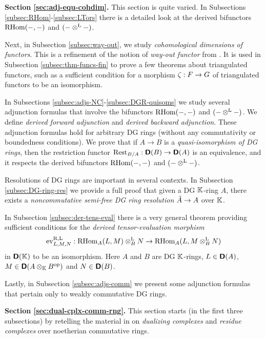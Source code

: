 \medskip \noindent 
{\bf Section \ref{sec:adj-equ-cohdim}.}
This section is quite varied. 
In Subsections \ref{subsec:RHom}-\ref{subsec:LTors} there is
a detailed look at the derived bifunctors 
$\operatorname{RHom}(-,-)$ and $(- \otimes^{\mathrm{L}} -)$. 

Next, in Subsection \ref{subsec:way-out}, we study {\em cohomological 
dimensions of functors}. This is a refinement of the notion of {\em way-out 
functor} from \cite{RD}. It is used in Subsection \ref{subsec:thm-funcs-fin} to 
prove a few theorems about triangulated functors, such as a sufficient condition 
for a morphism $\zeta : F \to G$ of triangulated functors to be an isomorphism. 

In Subsections \ref{subsec:adjs-NC}-\ref{subsec:DGR-quisoms} we study 
several adjunction formulas that involve 
the bifunctors $\operatorname{RHom}(-,-)$ and $(- \otimes^{\mathrm{L}} -)$.
We define {\em derived forward adjunction} and  
{\em derived backward adjunction}. These adjunction formulas hold for 
arbitrary DG rings (without any commutativity or boundedness conditions). 
We prove that if $A \to B$ is a {\em quasi-isomorphism of DG rings}, then 
the restriction functor 
$\operatorname{Rest}_{B / A} : \boldsymbol{\mathsf{D}}(B) \to \boldsymbol{\mathsf{D}}(A)$
is an equivalence, and it respects the derived bifunctors 
$\operatorname{RHom}(-,-)$ and $(- \otimes^{\mathrm{L}} -)$.

Resolutions of DG rings are important in several contexts. In Subsection 
\ref{subsec:DG-ring-res} we provide a full proof that given a 
DG $\mathbb{K}$-ring $A$, there exists a {\em noncommutative semi-free DG ring 
resolution} $\tilde{A} \to A$ over $\mathbb{K}$.

In Subsection \ref{subsec:der-tens-eval} there is a very general 
theorem providing sufficient conditions for the {\em derived tensor-evaluation 
morphism}
\begin{equation} \label{eqn:4610}
\operatorname{ev}^{\mathrm{R, L}}_{L, M, N} :
\operatorname{RHom}_{A}(L, M) \otimes^{\mathrm{L}}_{B} N \to 
\operatorname{RHom}_{A}(L, M \otimes^{\mathrm{L}}_{B} N)
\end{equation}
in $\boldsymbol{\mathsf{D}}(\mathbb{K})$ to be an isomorphism. Here $A$ and $B$ are DG $\mathbb{K}$-rings, 
$L \in \boldsymbol{\mathsf{D}}(A)$, $M \in \boldsymbol{\mathsf{D}}(A \otimes_{\mathbb{K}} B^{\mathrm{op}})$ and 
$N \in \boldsymbol{\mathsf{D}}(B)$.

Lastly, in Subsection \ref{subsec:adjs-comm} we present some 
adjunction formulas that pertain only to weakly commutative DG rings. 




\medskip \noindent 
{\bf Section \ref{sec:dual-cplx-comm-rng}.}
This section starts (in the first three subsections) by retelling the material 
in \cite{RD} on {\em dualizing complexes} and {\em residue complexes} over 
noetherian commutative rings.

